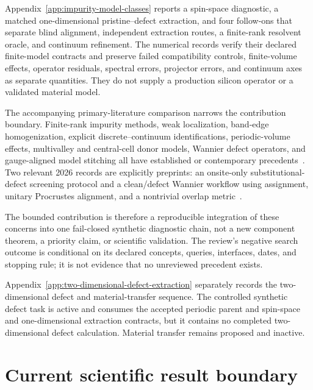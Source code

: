 Appendix~\ref{app:impurity-model-classes} reports a spin-space diagnostic, a
matched one-dimensional pristine--defect extraction, and four follow-ons that
separate blind alignment, independent extraction routes, a finite-rank
resolvent oracle, and continuum refinement. The numerical records verify their
declared finite-model contracts and preserve failed compatibility controls,
finite-volume effects, operator residuals, spectral errors, projector errors,
and continuum axes as separate quantities. They do not supply a production
silicon operator or a validated material model.

The accompanying primary-literature comparison narrows the contribution
boundary. Finite-rank impurity methods, weak localization, band-edge
homogenization, explicit discrete--continuum identifications, periodic-volume
effects, multivalley and central-cell donor models, Wannier defect operators,
and gauge-aligned model stitching all have established or contemporary
precedents~\cite{kosterSlater1954impurity,simon1976weak,parzygnat2010,hoeferWeinstein2011,ducheneVukicevicWeinstein2015,nakamuraTadano2021,koenigLeeHammer2011,kohnLuttinger1955donor,gamble2015,berlijnVoljaKu2011,corsettiMostofi2011,lihmPark2019,luParkZhouBernardi2020}.
Two relevant 2026 records are explicitly preprints: an onsite-only
substitutional-defect screening protocol and a clean/defect Wannier workflow
using assignment, unitary Procrustes alignment, and a nontrivial overlap
metric~\cite{kangMuechler2026,shiXieZhangChuGong2026}.

The bounded contribution is therefore a reproducible integration of these
concerns into one fail-closed synthetic diagnostic chain, not a new component
theorem, a priority claim, or scientific validation. The review's negative
search outcome is conditional on its declared concepts, queries, interfaces,
dates, and stopping rule; it is not evidence that no unreviewed precedent
exists.

Appendix~\ref{app:two-dimensional-defect-extraction} separately records the
two-dimensional defect and material-transfer sequence. The controlled synthetic
defect task is active and consumes the accepted periodic parent and spin-space
and one-dimensional extraction contracts, but it contains no completed
two-dimensional defect calculation. Material transfer remains proposed and
inactive.

\section{Current scientific result boundary}


